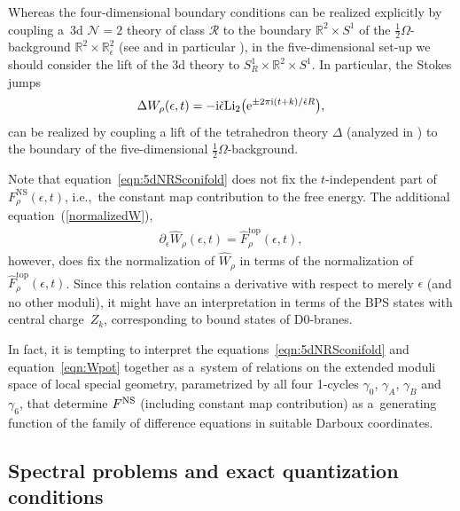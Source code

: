 \documentclass[pdftex]{sigma}
\numberwithin{equation}{section}
\begin{document}
Whereas the four-dimensional boundary conditions can be realized explicitly by coupling a~3d $\mathcal{N}=2$ theory of class $\mathcal{R}$ to the boundary $\mathbb{R}^2 \times S^1$ of the $\frac{1}{2}\Omega$-background $ \mathbb{R}^2 \times \mathbb{R}_\epsilon^2$ (see \cite{Hollands:t3abel} and in particular \cite[Section 5.7]{Hollands:recipe}), in the five-dimensional set-up we should consider the lift of the 3d theory to $S^1_R \times \mathbb{R}^2 \times S^1$. In particular, the Stokes jumps
\begin{equation*}
\Delta W_\rho(\epsilon,t) = -\mathrm{i} \check{\epsilon} \mathrm{Li}_2\big({\rm e}^{\pm 2\pi \mathrm{i} ( t + k)/\check \epsilon R }\big),
\end{equation*}
can be realized by coupling a lift of the tetrahedron theory $\Delta$ (analyzed in \cite{Dimofte:2011ju}) to the boundary of the five-dimensional $\frac{1}{2}\Omega$-background.

Note that equation~\eqref{eqn:5dNRSconifold} does not fix the $t$-independent part of $F^{\mathrm{NS}}_\rho(\epsilon,t)$, i.e.,~the constant map contribution to the free energy. The additional equation~(\ref{normalizedW}),
\begin{gather}\label{eqn:Wpot}
\partial_\epsilon \hat{W}_\rho (\epsilon,t) = \hat{F}^\mathrm{top}_\rho (\epsilon,t),
\end{gather}
however, does fix the normalization of $\hat{W}_\rho$ in terms of the normalization of $\hat{F}^\mathrm{top}_\rho (\epsilon,t)$. Since this relation contains a derivative with respect to merely $\epsilon$ (and no other moduli), it might have an interpretation in terms of the BPS states with central charge~$Z_k$, corresponding to bound states of D0-branes.

In fact, it is tempting to interpret the equations~\eqref{eqn:5dNRSconifold} and equation~\eqref{eqn:Wpot} together as a~system of relations on the extended moduli space of local special geometry, parametrized by all four 1-cycles $\gamma_0$, $\gamma_A$, $\gamma_B$ and $\gamma_6$, that determine $F^{\rm NS}$ (including constant map contribution) as a~generating function of the family of difference equations in suitable Darboux coordinates.

\subsection{Spectral problems and exact quantization conditions}\label{sec:spectralproblem}
\end{document}
